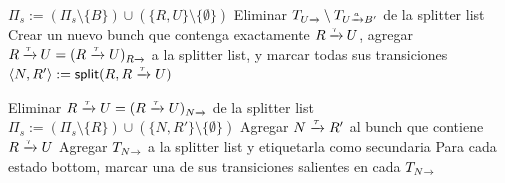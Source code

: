 \begin{algorithm}[!t]
{\begin{algorithmic}[1]
			\STATE	$\Pi_s := (\Pi_s \setminus \{ B \}) \cup (\{ R, U \} \setminus \{ \emptyset \})$\label{alg-split1}
					\STATE	Eliminar $T_{U\pijl{}} \setminus T_{U\pijl{a} B'}$ de la splitter list\label{alg:line-remove-TU-after-primary-split}
			\ENDIF
			\label{alg:inert_condition}
				\STATE	Crear un nuevo bunch que contenga exactamente $R \mathbin{\pijl{\tau}} U$,
						agregar $R \mathbin{\pijl{\tau}} U = (R \pijl{\tau} U)_{R \pijl{}}$ a la splitter list,
						y marcar todas sus transiciones\label{alg:new_bunch}
				\STATE	$\langle N, R' \rangle :=\mathsf{split}(R, R \pijl{\tau} U)$
							\label{alg:split-call2}
				\item[]	\mbox{}%
				\STATE	Eliminar $R \pijl{\tau} U = (R \pijl{\tau} U)_{N \pijl{}}$ de la splitter list
				\STATE	%
									$\Pi_s := (\Pi_s \setminus \{ R \}) \cup (\{ N, R' \} \setminus \{ \emptyset \})$\label{alg-split2}
				\STATE	Agregar $N \pijl{\tau} R'$ al bunch que contiene $R \pijl{\tau} U$\label{alg:extend_bunch}
				\STATE	Agregar $T_{N \pijl{}}$ a la splitter list y etiquetarla como secundaria
						\label{alg:line-make-all-slices-unstable}
				\STATE	Para cada estado bottom, marcar una de sus transiciones salientes en cada $T_{N \pijl{}}$ 
						\label{alg:line-mark-bb-of-new-bottom}
			\ENDIF
		\ENDFOR\label{alg-line-stabilize-end}
	\ENDWHILE\label{algo:main:outerloop-end}
	\end{algorithmic}
	}
	\end{algorithm}


